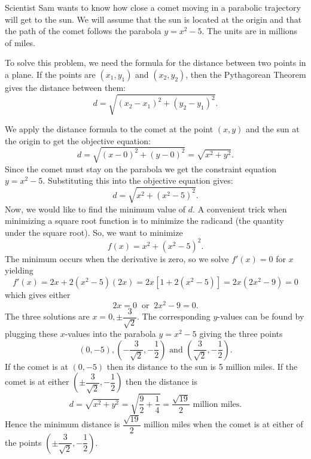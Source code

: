 \documentclass{ximera}
\begin{document}
\begin{example}[example 3]
Scientist Sam wants to know how close a comet moving in a parabolic trajectory will get to the sun. 
We will assume that the sun is located at the origin and that the path of the comet follows the parabola $y = x^2 - 5$. The units 
are in millions of miles.

\begin{center}
\end{center}
To solve this problem, we need the formula for the distance between two points in a plane.
If the points are $(x_1, y_1)$ and $(x_2, y_2)$, then the Pythagorean Theorem gives the distance between them:
\[
d = \sqrt{(x_2 - x_1)^2 + (y_2 - y_1)^2}.
\]
\begin{image}
\end{image}


We apply the distance formula to the comet at the point $(x, y)$ and the sun at the origin to get the objective equation:
\[d = \sqrt{(x-0)^2 + (y-0)^2} = \sqrt{x^2 + y^2}.\]
Since the comet must stay on the parabola we get the constraint equation $y = x^2 - 5$.  Substituting this into the objective equation gives:
\[d = \sqrt{x^2 + (x^2 - 5)^2}.\]
Now, we would like to find the minimum value of $d$. A convenient trick when minimizing a square root function is to minimize 
the radicand (the quantity under the square root).
So, we want to minimize 
\[
f(x) = x^2 + (x^2 - 5)^2.
\]
The minimum occurs when the derivative is zero, so we solve
$f'(x) = 0$ for $x$ yielding
\[f'(x) = 2x + 2(x^2 - 5)(2x) = 2x[1+ 2(x^2 - 5)] = 2x(2x^2 - 9) = 0\]
which gives either 
\[2x = 0 \;\; \text{or} \;\; 2x^2 - 9 = 0.\]
The three solutions are $x = 0, \pm \dfrac{3}{\sqrt2}$.
The corresponding $y$-values can be found by plugging these $x$-values into the parabola $y = x^2 - 5$
giving the three points
\[(0, -5), \left(-\dfrac{3}{\sqrt 2}, -\dfrac12 \right) \mbox{ and } \left(\dfrac{3}{\sqrt 2}, -\dfrac12 \right).\]
If the comet is at $(0, -5)$ then its distance to the sun is 5 million miles.  If the comet is at 
either $\left(\pm\dfrac{3}{\sqrt 2}, -\dfrac12\right)$ then the distance is 
\[d = \sqrt{x^2 + y^2} = \sqrt{{\frac{9}{2} + \frac14}} = \frac{\sqrt {19}}{2} \mbox{ million miles}.\]
Hence the minimum distance is $\dfrac{\sqrt{19}}{2}$ million miles when the comet is at either of the points 
$\left(\pm\dfrac{3}{\sqrt 2}, -\dfrac12 \right)$.
\end{example}
\end{document}
